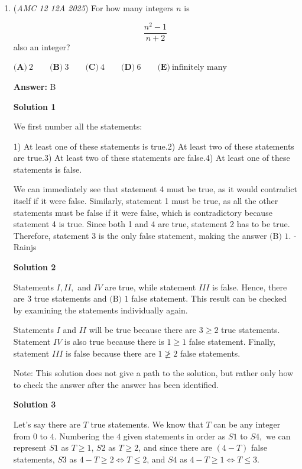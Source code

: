 \begin{enumerate}
 


 


	\item (\textit{AMC 12 12A 2025}) For how many integers $n$ is

 \[\frac{n^{2}-1}{n+2}\]
also an integer?


 $\textbf{(A)}\   2  \qquad                 \textbf{(B)}\   3  \qquad                 \textbf{(C)}\   4  \qquad                 \textbf{(D)}\   6  \qquad                 \textbf{(E)}\   \text{infinitely many}$

 \textbf{Answer: }B



\textbf{Solution 1}

We first number all the statements:

 1) At least one of these statements is true.2) At least two of these statements are true.3) At least two of these statements are false.4) At least one of these statements is false.

 We can immediately see that statement 4 must be true, as it would contradict itself if it were false. Similarly, statement 1 must be true, as all the other statements must be false if it were false, which is contradictory because statement 4 is true. Since both 1 and 4 are true, statement 2 has to be true. Therefore, statement 3 is the only false statement, making the answer $\boxed{\text{(B) }1}$. -Rainjs

 



\textbf{Solution 2}

Statements $I,II,$ and $IV$ are true, while statement $III$ is false. Hence, there are $3$ true statements and $\boxed{\text{(B) }1}$ false statement. This result can be checked by examining the statements individually again.

 Statements $I$ and $II$ will be true because there are $3\ge2$ true statements. Statement $IV$ is also true because there is $1\ge1$ false statement. Finally, statement $III$ is false because there are $1\ngeq2$ false statements.

 Note: This solution does not give a path to the solution, but rather only how to check the answer after the answer has been identified.

 



\textbf{Solution 3}

Let's say there are $T$ true statements. We know that $T$ can be any integer from $0$ to $4$. Numbering the $4$ given statements in order as $S1$ to $S4,$ we can represent $S1$ as $T \geq 1$, $S2$ as $T \geq 2$, and since there are $(4-T)$ false statements, $S3$ as $4-T \geq 2 \iff T \leq 2$, and $S4$ as $4-T \geq 1 \iff T \leq 3$.


\end{enumerate}
